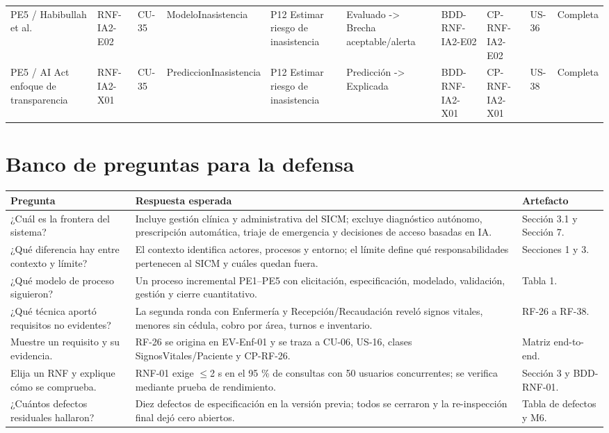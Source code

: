 \documentclass[11pt,a4paper]{article}
\begin{document}
\begin{appendices}
\begin{landscape}
\begin{longtable}{p{2.2cm}p{1.8cm}p{2cm}p{3cm}p{3cm}p{3cm}p{2cm}p{2cm}p{2cm}p{1.6cm}}
			PE5 / Habibullah et al. & RNF-IA2-E02 & CU-35 & ModeloInasistencia & P12 Estimar riesgo de inasistencia & Evaluado -> Brecha aceptable/alerta & BDD-RNF-IA2-E02 & CP-RNF-IA2-E02 & US-36 & Completa\\
			PE5 / AI Act enfoque de transparencia & RNF-IA2-X01 & CU-35 & PrediccionInasistencia & P12 Estimar riesgo de inasistencia & Predicción -> Explicada & BDD-RNF-IA2-X01 & CP-RNF-IA2-X01 & US-38 & Completa\\
			\bottomrule\end{longtable}\end{landscape}
	
	\section{Banco de preguntas para la defensa}
	\begin{longtable}{p{4.6cm}p{7.5cm}p{3cm}}\toprule\textbf{Pregunta}&\textbf{Respuesta esperada}&\textbf{Artefacto}\\\midrule\endhead
		¿Cuál es la frontera del sistema? & Incluye gestión clínica y administrativa del SICM; excluye diagnóstico autónomo, prescripción automática, triaje de emergencia y decisiones de acceso basadas en IA. & Sección 3.1 y Sección 7. \\
		¿Qué diferencia hay entre contexto y límite? & El contexto identifica actores, procesos y entorno; el límite define qué responsabilidades pertenecen al SICM y cuáles quedan fuera. & Secciones 1 y 3. \\
		¿Qué modelo de proceso siguieron? & Un proceso incremental PE1--PE5 con elicitación, especificación, modelado, validación, gestión y cierre cuantitativo. & Tabla 1. \\
		¿Qué técnica aportó requisitos no evidentes? & La segunda ronda con Enfermería y Recepción/Recaudación reveló signos vitales, menores sin cédula, cobro por área, turnos e inventario. & RF-26 a RF-38. \\
		Muestre un requisito y su evidencia. & RF-26 se origina en EV-Enf-01 y se traza a CU-06, US-16, clases SignosVitales/Paciente y CP-RF-26. & Matriz end-to-end. \\
		Elija un RNF y explique cómo se comprueba. & RNF-01 exige $\leq$2 s en el 95 \% de consultas con 50 usuarios concurrentes; se verifica mediante prueba de rendimiento. & Sección 3 y BDD-RNF-01. \\
		¿Cuántos defectos residuales hallaron? & Diez defectos de especificación en la versión previa; todos se cerraron y la re-inspección final dejó cero abiertos. & Tabla de defectos y M6. \\

\end{longtable}
\end{appendices}
\end{document}
